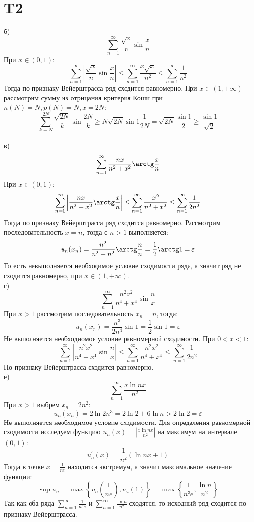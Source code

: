 \documentclass[12pt]{article}
\begin{document}
\section{T2}
б)
\[
    \sum_{n=1}^{\infty} \frac{\sqrt{x} }{n}\sin \frac{x}{n}
\]
При $x \in (0, 1)$:
\[
    \sum_{n=1}^{\infty} \left\vert \frac{\sqrt{x} }{n}\sin \frac{x}{n} \right\vert  \leq \sum_{n=1}^{\infty} \frac{x \sqrt{x}}{n^2} \leq \sum_{n=1}^{\infty} \frac{1}{n^2}
\]
Тогда по признаку Вейерштрасса ряд сходится равномерно.
При $x \in (1, +\infty)$ рассмотрим сумму из отрицания критерия Коши при $n(N) = N, p(N) = N, x = 2N$:
\[
    \sum_{k=N}^{2N} \frac{\sqrt{2N}}{k} \sin \frac{2N}{k} \geq N \sqrt{2N} \sin 1 \frac{1}{2N} = \sqrt{2N} \frac{\sin 1}{2} \geq \frac{\sin 1}{\sqrt{2} }
\]
\\ в)
\[
    \sum_{n=1}^{\infty} \frac{nx}{n^2 + x^2} \arctg \frac{x}{n}
\]
При $x \in (0, 1)$:
\[
    \sum_{n=1}^{\infty} \left\vert \frac{nx}{n^2 + x^2} \arctg \frac{x}{n} \right\vert  \leq \sum_{n=1}^{\infty} \frac{x^2}{n^2 + x^2} \leq \sum_{n=1}^{\infty} \frac{1}{2n^2}
\]
Тогда по признаку Вейерштрасса ряд сходится равномерно.
Рассмотрим последовательность $x = n$, тогда с $n > 1$ выполняется:
\[
    u_n(x_n) = \frac{n^2}{n^2 + n^2} \arctg \frac{n}{n} = \frac{1}{2} \arctg 1 = \varepsilon
\]
То есть невыполняется необходимое условие сходимости ряда, а значит ряд не сходится равномерно, при $x \in (1, +\infty)$.
\\ г)
\[
    \sum_{n=1}^{\infty} \frac{n^2 x^2}{n^4 + x^4} \sin \frac{n}{x}
\]
При $x > 1$ рассмотрим последовательность $x_n = n$, тогда:
\[
    u_n(x_n) = \frac{n^3}{2 n^4} \sin 1 = \frac{1}{2} \sin 1 = \varepsilon
\]
Не выполняется необходиомое условие равномерной сходимости.
При $0 < x < 1$:
\[
    \sum_{n=1}^{\infty} \left\vert \frac{n^2 x^2}{n^4 + x^4} \sin \frac{n}{x} \right\vert \leq \sum_{n=1}^{\infty} \frac{n^2 x^2}{n^4 + x^4} \leq \sum_{n=1}^{\infty} \frac{1}{2n^2}
\]
По признаку Вейерштрасса сходится равномерно.
\\ е)
\[
    \sum_{n=1}^{\infty} \frac{x\ln nx}{n^2}
\]
При $x > 1$ выбрем $x_n = 2n^2$:
\[
    u_n(x_n) = 2 \ln 2n^3 = 2\ln 2 + 6 \ln n > 2\ln 2 = \varepsilon
\]
Не выполняется необходимое условие сходимости. Для определения равномерной сходимости исследуем
функцию $u_n(x) = \left\vert \frac{x\ln nx}{n^2} \right\vert $ на максимум на интервале $(0, 1)$:
\[
    u_n^{\prime}(x) = \frac{1}{n^2}(\ln nx + 1)
\]
Тогда в точке $x = \frac{1}{ne}$ находится экстремум, а значит
максимальное значение функции:
\[
    \sup u_n = \max \left\{ u_n(\frac{1}{ne}), u_n(1) \right\} =
    \max \left\{ \frac{1}{n^3 e}, \frac{\ln n}{n^2} \right\}
\]
Так как оба ряда $\sum_{n=1}^{\infty} \frac{1}{n^3 e}$ и $\sum_{n=1}^{\infty} \frac{\ln n}{n^2}$ сходятся, то
исходный ряд сходится по признаку Вейерштрасса.
\end{document}
